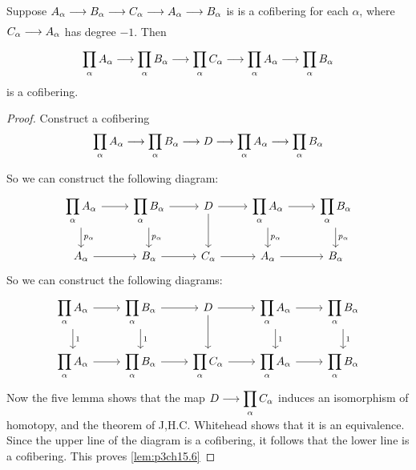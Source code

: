 \documentclass[../main]{subfiles}
\begin{document}
\begin{customlemma}{15.6}\label{lem:p3ch15.6}
Suppose $A_\alpha\lar{}B_\alpha\lar{}C_\alpha\lar{}A_\alpha\lar{}B_\alpha$ is is a cofibering for each $\alpha$, where $C_\alpha\lar{}A_\alpha$ has degree $-1$. Then
\[\displaystyle\prod_\alpha A_\alpha\lar{}\displaystyle\prod_\alpha B_\alpha\lar{}\displaystyle\prod_\alpha C_\alpha\lar{}\displaystyle\prod_\alpha A_\alpha\lar{} \displaystyle\prod_\alpha B_\alpha\]
is a cofibering.
\end{customlemma}
\begin{proof}
Construct a cofibering 
\[\displaystyle\prod_\alpha A_\alpha\lar{}\displaystyle\prod_\alpha B_\alpha\lar{}D\lar{}\displaystyle\prod_\alpha A_\alpha\lar{} \displaystyle\prod_\alpha B_\alpha\]

So we can construct the following diagram:
\[
\begin{tikzcd}
    \displaystyle\prod_\alpha A_\alpha \arrow[r]\arrow[d,"p_\alpha"]   &\displaystyle\prod_\alpha B_\alpha \arrow[r]\arrow[d,"p_\alpha"] & D\arrow[r]\arrow[d] & \displaystyle\prod_\alpha A_\alpha\arrow[r]\arrow[d,"p_\alpha"] & \displaystyle\prod_\alpha B_\alpha \arrow[d,"p_\alpha"]\\
 A_\alpha\arrow[r] & B_\alpha\arrow[r] &  C_\alpha\arrow[r] &  A_\alpha\arrow[r] &  B_\alpha
\end{tikzcd}
\]
So we can construct the following diagrams:
\[
\begin{tikzcd}
    \displaystyle\prod_\alpha A_\alpha \arrow[r]\arrow[d,"1"]   &\displaystyle\prod_\alpha B_\alpha \arrow[r]\arrow[d,"1"] & D\arrow[r]\arrow[d] & \displaystyle\prod_\alpha A_\alpha\arrow[r]\arrow[d,"1"] & \displaystyle\prod_\alpha B_\alpha \arrow[d,"1"]\\
\displaystyle\prod_\alpha A_\alpha\arrow[r] & \displaystyle\prod_\alpha B_\alpha\arrow[r] & \displaystyle\prod_\alpha C_\alpha\arrow[r] & \displaystyle\prod_\alpha A_\alpha\arrow[r] & \displaystyle\prod_\alpha B_\alpha
\end{tikzcd}
\]
Now the five lemma shows that the map $D\lar{}\displaystyle\prod_\alpha C_\alpha$ induces an isomorphism of homotopy, and the theorem of J,H.C. Whitehead shows
that it is an equivalence. Since the upper line of the diagram is a cofibering, it follows that the lower line is a cofibering. This proves \ref{lem:p3ch15.6}
\end{proof}
\end{document}
